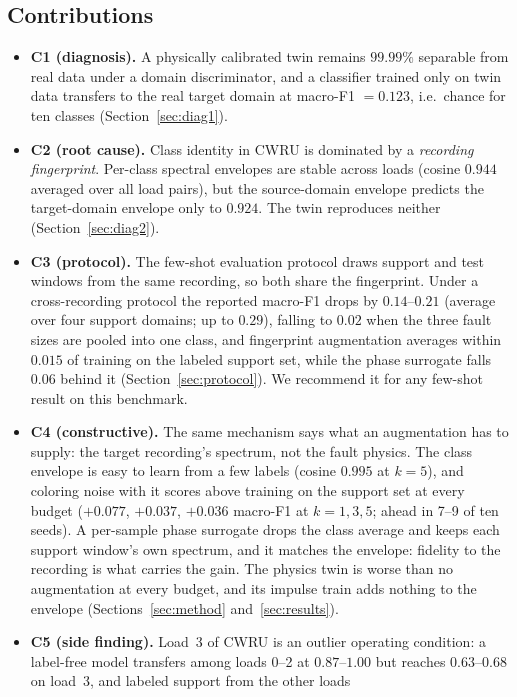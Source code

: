 \documentclass[journal]{IEEEtran}
\begin{document}
\subsection{Contributions}
\begin{itemize}
\item \textbf{C1 (diagnosis).} A physically calibrated twin remains
$99.99\%$ separable from real data under a domain discriminator, and a
classifier trained only on twin data transfers to the real target domain at
macro-F1 $=0.123$, i.e.\ chance for ten classes (Section~\ref{sec:diag1}).
\item \textbf{C2 (root cause).} Class identity in CWRU is dominated by a
\emph{recording fingerprint}. Per-class spectral envelopes are stable across
loads (cosine $0.944$ averaged over all load pairs), but the source-domain
envelope predicts the target-domain envelope only to $0.924$. The twin
reproduces neither (Section~\ref{sec:diag2}).
\item \textbf{C3 (protocol).} The few-shot evaluation protocol draws support
and test windows from the same recording, so both share the fingerprint. Under
a cross-recording protocol the reported macro-F1 drops by $0.14$--$0.21$
(average over four support domains; up to $0.29$), falling to $0.02$ when the
three fault sizes are pooled into one class, and fingerprint
augmentation averages within $0.015$ of training on the labeled support set,
while the phase surrogate falls $0.06$ behind it
(Section~\ref{sec:protocol}). We recommend it for any few-shot result on this
benchmark.
\item \textbf{C4 (constructive).} The same mechanism says what an augmentation
has to supply: the target recording's spectrum, not the fault physics. The
class envelope is easy to learn from a few labels (cosine $0.995$ at $k=5$),
and coloring noise with it scores above training on the support set at every
budget ($+0.077$, $+0.037$, $+0.036$ macro-F1 at $k=1,3,5$; ahead in 7--9 of
ten seeds).
A per-sample phase surrogate drops the class average and keeps each support
window's own spectrum, and it matches the envelope: fidelity to the recording
is what carries the gain. The physics twin is worse than no augmentation at
every budget, and its impulse train adds nothing to the envelope
(Sections~\ref{sec:method} and~\ref{sec:results}).
\item \textbf{C5 (side finding).} Load~3 of CWRU is an outlier operating
condition: a label-free model transfers among loads 0--2 at $0.87$--$1.00$ but
reaches $0.63$--$0.68$ on load~3, and labeled support from the other loads

\end{itemize}
\end{document}
